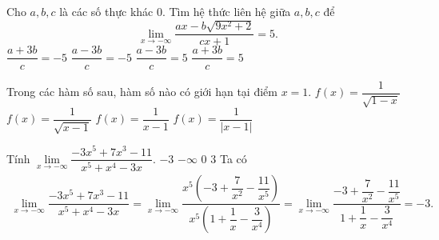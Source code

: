 \begin{ex}%
	Cho $a,b,c$ là các số thực khác $0$. Tìm hệ thức liên hệ giữa $a,b,c$ để $$\lim\limits_{x \to - \infty} \dfrac{ax - b\sqrt{9x^2+2}}{cx+1}=5.$$
 	\choice
	{$\dfrac{a+3b}{c}=-5$}
	{$\dfrac{a-3b}{c}=-5$}
	{$\dfrac{a-3b}{c}=5$}
	{\True $\dfrac{a+3b}{c}=5$}
\end{ex}
\begin{ex}%
	Trong các hàm số sau, hàm số nào có giới hạn tại điểm $x=1$.
	\choice
	{$f(x)=\dfrac{1}{\sqrt{1-x}}$}
	{$f(x)=\dfrac{1}{\sqrt{x-1}}$}
	{$f(x)=\dfrac{1}{x-1}$}
	{\True $f(x)=\dfrac{1}{|x-1|}$}
\end{ex}
\begin{ex}%
 Tính $\lim\limits_{x \to -\infty}\dfrac{-3x^5+7x^3-11}{x^5+x^4-3x}$.
 \choice
  {\True $-3$}
  {$-\infty$}
  {$0$}
  {$3$}
 \loigiai
  {
  Ta có
  \begin{eqnarray*}
   \lim\limits_{x \to -\infty}\dfrac{-3x^5+7x^3-11}{x^5+x^4-3x} = \lim\limits_{x \to -\infty}\dfrac{x^5\left( -3+\dfrac{7}{x^2}-\dfrac{11}{x^5} \right)}{x^5\left( 1+\dfrac{1}{x}-\dfrac{3}{x^4} \right)} = \lim\limits_{x \to -\infty}\dfrac{-3+\dfrac{7}{x^2}-\dfrac{11}{x^5}}{1+\dfrac{1}{x}-\dfrac{3}{x^4}}=-3.
  \end{eqnarray*}
  }
\end{ex}

